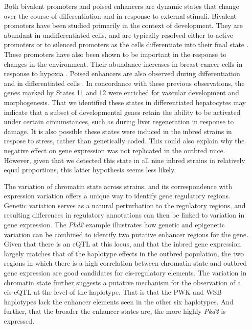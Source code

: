 \documentclass[
  11pt,
]{article}
\begin{document}
Both bivalent promoters and poised enhancers are dynamic states that
change over the course of differentiation and in response to external
stimuli. Bivalent promoters have been studied primarily in the context
of development. They are abundant in undifferentiated cells, and are
typically resolved either to active promoters or to silenced promoters
as the cells differentiate into their final state
\citep{pmid23788621, pmid22513113}. These promoters have also been shown
to be important in the response to changes in the environment. Their
abundance increases in breast cancer cells in response to hypoxia
\citep{pmid27800026}. Poised enhancers are also observed during
differentiation and in differentiated cells \citep{pmid32432110}. In
concordance with these previous observations, the genes marked by States
11 and 12 were enriched for vascular development and morphogenesis. That
we identified these states in differentiated hepatocytes may indicate
that a subset of developmental genes retain the ability to be activated
under certain circumstances, such as during liver regeneration in
response to damage. It is also possible these states were induced in the
inbred strains in respose to stress, rather than genetically coded. This
could also explain why the negative effect on gene expression was not
replicated in the outbred mice. However, given that we detected this
state in all nine inbred strains in relatively equal proportions, this
latter hypothesis seems less likely.

The variation of chromatin state across strains, and its correspondence
with expression variation offers a unique way to identify gene
regulatory regions. Genetic variation serves as a natural perturbation
to the regulatory regions, and resulting differences in regulatory
annotations can then be linked to variation in gene expression. The
\textit{Pkd2} example illustrates how genetic and epigenetic variation
can be combined to identify two putative enhancer regions for the gene.
Given that there is an eQTL at this locus, and that the inbred gene
expression largely matches that of the haplotype effects in the outbred
population, the two regions in which there is a high correlation between
chromatin state and outbred gene expression are good candidates for
cis-regulatory elements. The variation in chromatin state further
suggests a putative mechanism for the observation of a cis-eQTL at the
level of the haplotype. That is that the PWK and WSB haplotypes lack the
enhancer elements seen in the other six haplotypes. And further, that
the broader the enhancer states are, the more highly \textit{Pkd2} is
expressed.
\end{document}

